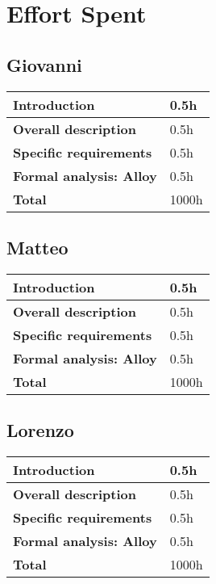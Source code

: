 \section{Effort Spent}
\subsection*{Giovanni}
\begin{table}[h]
    \begin{tabular}{|l|l|}
        \toprule
        \textbf{Introduction}           & 0.5h  \\ \midrule
        \textbf{Overall description}    & 0.5h  \\ \midrule
        \textbf{Specific requirements}  & 0.5h  \\ \midrule
        \textbf{Formal analysis: Alloy} & 0.5h  \\ \midrule
        \textbf{Total}                  & 1000h \\ \bottomrule
    \end{tabular}
\end{table}

\subsection*{Matteo}
\begin{table}[h]
    \begin{tabular}{|l|l|}
        \toprule
        \textbf{Introduction}           & 0.5h  \\ \midrule
        \textbf{Overall description}    & 0.5h  \\ \midrule
        \textbf{Specific requirements}  & 0.5h  \\ \midrule
        \textbf{Formal analysis: Alloy} & 0.5h  \\ \midrule
        \textbf{Total}                  & 1000h \\ \bottomrule
    \end{tabular}
\end{table}

\subsection*{Lorenzo}
\begin{table}[h]
    \begin{tabular}{|l|l|}
        \toprule
        \textbf{Introduction}           & 0.5h  \\ \midrule
        \textbf{Overall description}    & 0.5h  \\ \midrule
        \textbf{Specific requirements}  & 0.5h  \\ \midrule
        \textbf{Formal analysis: Alloy} & 0.5h  \\ \midrule
        \textbf{Total}                  & 1000h \\ \bottomrule
    \end{tabular}
\end{table}